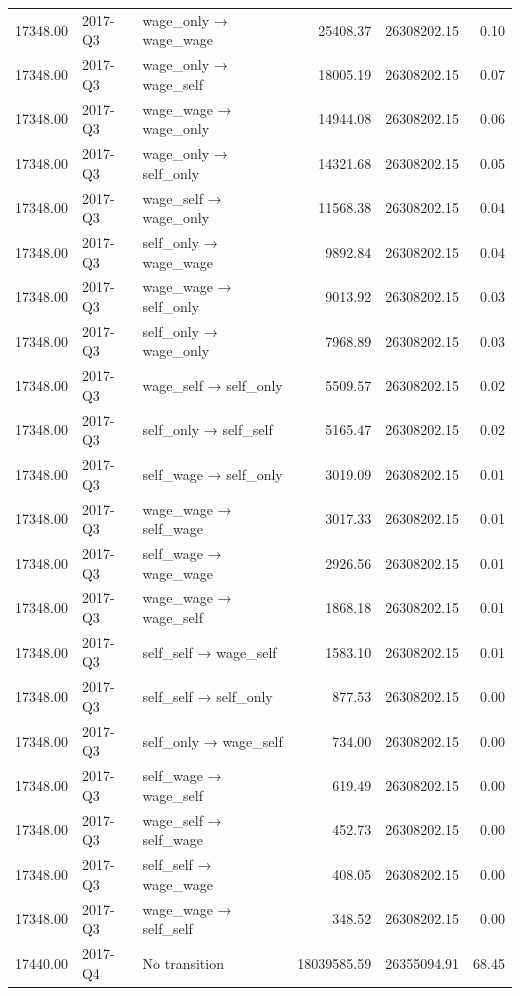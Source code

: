 \begin{table}[ht]
{\begin{tabular}{rllrrr}
  17348.00 & 2017-Q3 & wage\_only → wage\_wage & 25408.37 & 26308202.15 & 0.10 \\ 
  17348.00 & 2017-Q3 & wage\_only → wage\_self & 18005.19 & 26308202.15 & 0.07 \\ 
  17348.00 & 2017-Q3 & wage\_wage → wage\_only & 14944.08 & 26308202.15 & 0.06 \\ 
  17348.00 & 2017-Q3 & wage\_only → self\_only & 14321.68 & 26308202.15 & 0.05 \\ 
  17348.00 & 2017-Q3 & wage\_self → wage\_only & 11568.38 & 26308202.15 & 0.04 \\ 
  17348.00 & 2017-Q3 & self\_only → wage\_wage & 9892.84 & 26308202.15 & 0.04 \\ 
  17348.00 & 2017-Q3 & wage\_wage → self\_only & 9013.92 & 26308202.15 & 0.03 \\ 
  17348.00 & 2017-Q3 & self\_only → wage\_only & 7968.89 & 26308202.15 & 0.03 \\ 
  17348.00 & 2017-Q3 & wage\_self → self\_only & 5509.57 & 26308202.15 & 0.02 \\ 
  17348.00 & 2017-Q3 & self\_only → self\_self & 5165.47 & 26308202.15 & 0.02 \\ 
  17348.00 & 2017-Q3 & self\_wage → self\_only & 3019.09 & 26308202.15 & 0.01 \\ 
  17348.00 & 2017-Q3 & wage\_wage → self\_wage & 3017.33 & 26308202.15 & 0.01 \\ 
  17348.00 & 2017-Q3 & self\_wage → wage\_wage & 2926.56 & 26308202.15 & 0.01 \\ 
  17348.00 & 2017-Q3 & wage\_wage → wage\_self & 1868.18 & 26308202.15 & 0.01 \\ 
  17348.00 & 2017-Q3 & self\_self → wage\_self & 1583.10 & 26308202.15 & 0.01 \\ 
  17348.00 & 2017-Q3 & self\_self → self\_only & 877.53 & 26308202.15 & 0.00 \\ 
  17348.00 & 2017-Q3 & self\_only → wage\_self & 734.00 & 26308202.15 & 0.00 \\ 
  17348.00 & 2017-Q3 & self\_wage → wage\_self & 619.49 & 26308202.15 & 0.00 \\ 
  17348.00 & 2017-Q3 & wage\_self → self\_wage & 452.73 & 26308202.15 & 0.00 \\ 
  17348.00 & 2017-Q3 & self\_self → wage\_wage & 408.05 & 26308202.15 & 0.00 \\ 
  17348.00 & 2017-Q3 & wage\_wage → self\_self & 348.52 & 26308202.15 & 0.00 \\ 
  17440.00 & 2017-Q4 & No transition & 18039585.59 & 26355094.91 & 68.45 \\ 

\end{tabular}}
\end{table}
